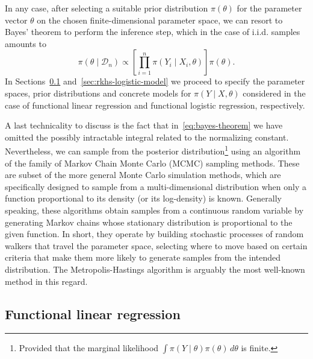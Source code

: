\documentclass[ba]{imsart}
\numberwithin{equation}{section}
\theoremstyle{plain}
\begin{document}
In any case, after selecting a suitable prior distribution \(\pi(\theta)\) for the parameter vector \(\theta\) on the chosen finite-dimensional parameter space, we can resort to Bayes' theorem to perform the inference step, which in the case of i.i.d. samples amounts to
\begin{equation}\label{eq:bayes-theorem}
  \pi(\theta \mid \mathcal D_n) \propto \left[ \prod_{i=1}^n \pi(Y_i\mid X_i, \theta) \right]\pi(\theta).
\end{equation}
In Sections~\ref{sec:rkhs-linear-model} and~\ref{sec:rkhs-logistic-model} we proceed to specify the parameter spaces, prior distributions and concrete models for \(\pi(Y\mid X,\theta)\) considered in the case of functional linear regression and functional logistic regression, respectively.

A last technicality to discuss is the fact that in~\eqref{eq:bayes-theorem} we have omitted the possibly intractable integral related to the normalizing constant. Nevertheless, we can sample from the posterior distribution\footnote{Provided that the marginal likelihood \(\int \pi(Y\mid \theta)\pi(\theta)\, d\theta\) is finite.} using an algorithm of the family of Markov Chain Monte Carlo (MCMC) sampling methods. These are subset of the more general Monte Carlo simulation methods, which are specifically designed to sample from a multi-dimensional distribution when only a function proportional to its density (or its log-density) is known. Generally speaking, these algorithms obtain samples from a continuous random variable by generating Markov chains whose stationary distribution is proportional to the given function. In short, they operate by building stochastic processes of random walkers that travel the parameter space, selecting where to move based on certain criteria that make them more likely to generate samples from the intended distribution. The Metropolis-Hastings algorithm \citep[e.g.][]{chib1995understanding} is arguably the most well-known method in this regard.

\subsection{Functional linear regression}\label{sec:rkhs-linear-model}
\end{document}
